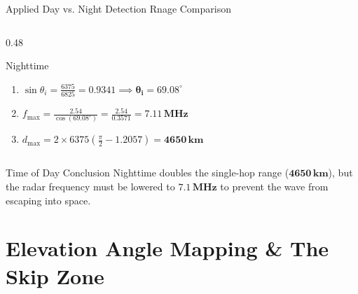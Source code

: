 \documentclass[aspectratio=169, 10pt]{beamer}
\newcommand{\km}{km} %
\begin{document}
\begin{frame}{Applied Day vs. Night Detection Rnage Comparison}
\begin{columns}[T]
\begin{column}{0.48\textwidth}
\begin{block}{Nighttime}
\begin{enumerate}
                    \item $\sin\theta_i = \frac{6375}{6825} = 0.9341 \implies \mathbf{\theta_i = 69.08^\circ}$
                    \item $f_{\max} = \frac{2.54}{\cos(69.08^\circ)} = \frac{2.54}{0.3571} = \mathbf{7.11\,\si{\mega\hertz}}$
                    \item $d_{\max} = 2 \times 6375 \left(\frac{\pi}{2} - 1.2057\right) = \mathbf{4650\,\si{\km}}$
                \end{enumerate}
            \end{block}
        \end{column}
    \end{columns}

    \begin{alertblock}{Time of Day Conclusion}
        Nighttime doubles the single-hop range ($\mathbf{4650\,\si{\km}}$), but the radar frequency must be lowered to $\mathbf{7.1\,\si{\mega\hertz}}$ to prevent the wave from escaping into space.
    \end{alertblock}
\end{frame}

\section{Elevation Angle Mapping \& The Skip Zone}
\end{document}
